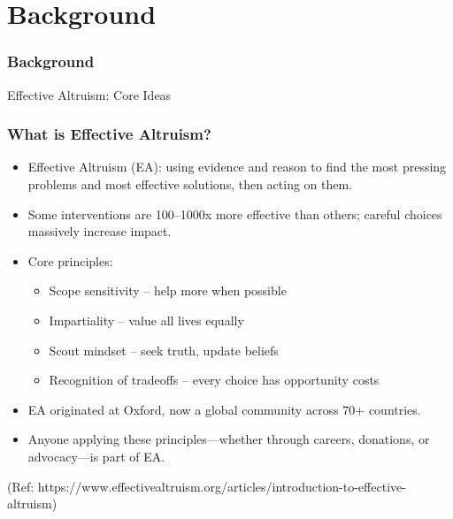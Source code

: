 \section{Background}

\begin{frame}[fragile]\frametitle{Background}
\begin{center}
{\Large Effective Altruism: Core Ideas}
\end{center}
\end{frame}


\begin{frame}[fragile]\frametitle{What is Effective Altruism?}
  \begin{itemize}
    \item Effective Altruism (EA): using evidence and reason to find the most pressing problems and most effective solutions, then acting on them.
    \item Some interventions are 100–1000x more effective than others; careful choices massively increase impact.
    \item Core principles: 
      \begin{itemize}
        \item Scope sensitivity – help more when possible
        \item Impartiality – value all lives equally
        \item Scout mindset – seek truth, update beliefs
        \item Recognition of tradeoffs – every choice has opportunity costs
      \end{itemize}
    \item EA originated at Oxford, now a global community across 70+ countries.
    \item Anyone applying these principles—whether through careers, donations, or advocacy—is part of EA.
  \end{itemize}
  
{\tiny (Ref: https://www.effectivealtruism.org/articles/introduction-to-effective-altruism)}  	  
  
\end{frame}

